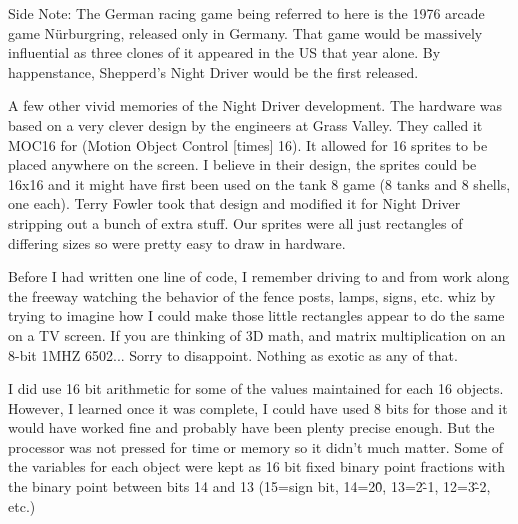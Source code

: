 \begin{tcolorbox}[]

        {
        Side Note: The German racing game being referred to here is the 1976 arcade game Nürburgring, released only in Germany. That game would be massively influential as three clones of it appeared in the US that year alone. By happenstance, Shepperd’s Night Driver would be the first released.}

\end{tcolorbox} 

A few other vivid memories of the Night Driver development. The hardware was based on a very clever design by the engineers at Grass Valley. They called it MOC16 for (Motion Object Control [times] 16). It allowed for 16 sprites to be placed anywhere on the screen. I believe in their design, the sprites could be 16x16 and it might have first been used on the tank 8 game (8 tanks and 8 shells, one each). Terry Fowler took that design and modified it for Night Driver stripping out a bunch of extra stuff. Our sprites were all just rectangles of differing sizes so were pretty easy to draw in hardware.

Before I had written one line of code, I remember driving to and from work along the freeway watching the behavior of the fence posts, lamps, signs, etc. whiz by trying to imagine how I could make those little rectangles appear to do the same on a TV screen. If you are thinking of 3D math, and matrix multiplication on an 8-bit 1MHZ 6502... Sorry to disappoint. Nothing as exotic as any of that. 

I did use 16 bit arithmetic for some of the values maintained for each 16 objects. However, I learned once it was complete, I could have used 8 bits for those and it would have worked fine and probably have been plenty precise enough. But the processor was not pressed for time or memory so it didn't much matter. Some of the variables for each object were kept as 16 bit fixed binary point fractions with the binary point between bits 14 and 13 (15=sign bit, 14=2\^0, 13=2\^-1, 12=3\^-2, etc.)

